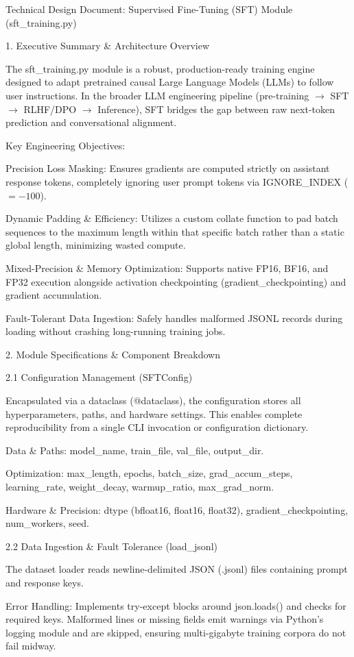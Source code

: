 Technical Design Document: Supervised Fine-Tuning (SFT) Module (sft_training.py)

1. Executive Summary & Architecture Overview

The sft_training.py module is a robust, production-ready training engine designed to adapt pretrained causal Large Language Models (LLMs) to follow user instructions. In the broader LLM engineering pipeline (pre-training $\rightarrow$ SFT $\rightarrow$ RLHF/DPO $\rightarrow$ Inference), SFT bridges the gap between raw next-token prediction and conversational alignment.

Key Engineering Objectives:

Precision Loss Masking: Ensures gradients are computed strictly on assistant response tokens, completely ignoring user prompt tokens via IGNORE_INDEX ($= -100$).

Dynamic Padding & Efficiency: Utilizes a custom collate function to pad batch sequences to the maximum length within that specific batch rather than a static global length, minimizing wasted compute.

Mixed-Precision & Memory Optimization: Supports native FP16, BF16, and FP32 execution alongside activation checkpointing (gradient_checkpointing) and gradient accumulation.

Fault-Tolerant Data Ingestion: Safely handles malformed JSONL records during loading without crashing long-running training jobs.

2. Module Specifications & Component Breakdown

2.1 Configuration Management (SFTConfig)

Encapsulated via a dataclass (@dataclass), the configuration stores all hyperparameters, paths, and hardware settings. This enables complete reproducibility from a single CLI invocation or configuration dictionary.

Data & Paths: model_name, train_file, val_file, output_dir.

Optimization: max_length, epochs, batch_size, grad_accum_steps, learning_rate, weight_decay, warmup_ratio, max_grad_norm.

Hardware & Precision: dtype (bfloat16, float16, float32), gradient_checkpointing, num_workers, seed.

2.2 Data Ingestion & Fault Tolerance (load_jsonl)

The dataset loader reads newline-delimited JSON (.jsonl) files containing prompt and response keys.

Error Handling: Implements try-except blocks around json.loads() and checks for required keys. Malformed lines or missing fields emit warnings via Python's logging module and are skipped, ensuring multi-gigabyte training corpora do not fail midway.

